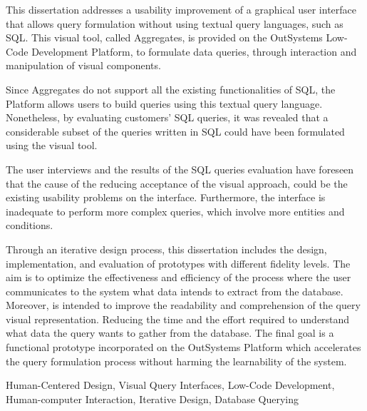 This dissertation addresses a usability improvement of a graphical user interface that allows query formulation without using textual query languages, such as SQL. This visual tool, called Aggregates, is provided on the OutSystems Low-Code Development Platform, to formulate data queries, through interaction and manipulation of visual components. 

Since Aggregates do not support all the existing functionalities of SQL, the Platform allows users to build queries using this textual query language. Nonetheless, by evaluating customers' SQL queries, it was revealed that a considerable subset of the queries written in SQL could have been formulated using the visual tool.

The user interviews and the results of the SQL queries evaluation have foreseen that the cause of the reducing acceptance of the visual approach, could be the existing usability problems on the interface. Furthermore, the interface is inadequate to perform more complex queries, which involve more entities and conditions.

Through an iterative design process, this dissertation includes the design, implementation, and evaluation of prototypes with different fidelity levels. The aim is to optimize the effectiveness and efficiency of the process where the user communicates to the system what data intends to extract from the database. Moreover, is intended to improve the readability and comprehension of the query visual representation. Reducing the time and the effort required to understand what data the query wants to gather from the database. The final goal is a functional prototype incorporated on the OutSystems Platform which accelerates the query formulation process without harming the learnability of the system.


\begin{keywords}
Human-Centered Design, Visual Query Interfaces, Low-Code Development, Human-computer Interaction, Iterative Design, Database Querying
\end{keywords} 

